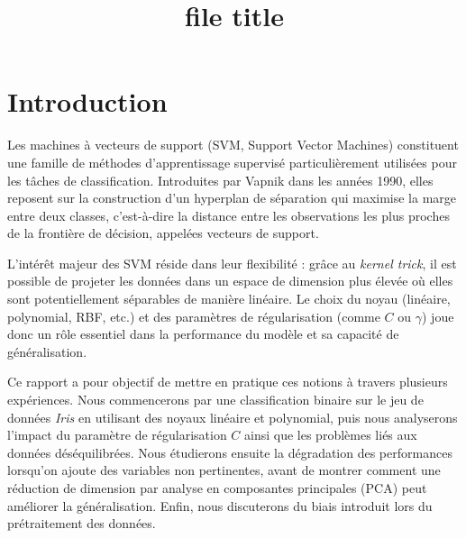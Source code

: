 \documentclass{rapport}
\title{file title}
\begin{document}

\subject{Support Vecteurs Machines (SVM)}



\buildmargins
\buildcover 
\toc 



\newpage

\section*{Introduction}

Les machines à vecteurs de support (SVM, Support Vector Machines) constituent une
famille de méthodes d’apprentissage supervisé particulièrement utilisées pour les tâches
de classification. Introduites par Vapnik dans les années 1990, elles reposent sur la
construction d’un hyperplan de séparation qui maximise la marge entre deux classes,
c’est-à-dire la distance entre les observations les plus proches de la frontière de décision,
appelées vecteurs de support.  

L’intérêt majeur des SVM réside dans leur flexibilité : grâce au \emph{kernel trick}, il est
possible de projeter les données dans un espace de dimension plus élevée où elles sont
potentiellement séparables de manière linéaire. Le choix du noyau (linéaire, polynomial,
RBF, etc.) et des paramètres de régularisation (comme $C$ ou $\gamma$) joue donc un rôle
essentiel dans la performance du modèle et sa capacité de généralisation.  

Ce rapport a pour objectif de mettre en pratique ces notions à travers plusieurs
expériences. Nous commencerons par une classification binaire sur le jeu de données
\emph{Iris} en utilisant des noyaux linéaire et polynomial, puis nous analyserons l’impact
du paramètre de régularisation $C$ ainsi que les problèmes liés aux données déséquilibrées.
Nous étudierons ensuite la dégradation des performances lorsqu’on ajoute des variables
non pertinentes, avant de montrer comment une réduction de dimension par analyse en
composantes principales (PCA) peut améliorer la généralisation. Enfin, nous discuterons
du biais introduit lors du prétraitement des données.  
\end{document}

